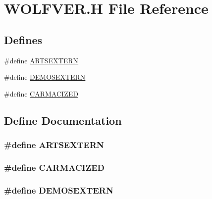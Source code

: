 \hypertarget{WOLFVER_8H}{
\section{WOLFVER.H File Reference}
\label{WOLFVER_8H}
}
\subsection*{Defines}
\begin{DoxyCompactItemize}
\item 
\#define \hyperlink{WOLFVER_8H_a36e8622d432bb1dcfc61ac233148b685}{ARTSEXTERN}
\item 
\#define \hyperlink{WOLFVER_8H_aa38bbec192ab8931f108d382f7833c31}{DEMOSEXTERN}
\item 
\#define \hyperlink{WOLFVER_8H_ab1d0a23b2e2640f4fbf73f30b3586f1b}{CARMACIZED}
\end{DoxyCompactItemize}


\subsection{Define Documentation}
\hypertarget{WOLFVER_8H_a36e8622d432bb1dcfc61ac233148b685}{
\subsubsection[{ARTSEXTERN}]{\setlength{\rightskip}{0pt plus 5cm}\#define ARTSEXTERN}}
\label{WOLFVER_8H_a36e8622d432bb1dcfc61ac233148b685}
\hypertarget{WOLFVER_8H_ab1d0a23b2e2640f4fbf73f30b3586f1b}{
\subsubsection[{CARMACIZED}]{\setlength{\rightskip}{0pt plus 5cm}\#define CARMACIZED}}
\label{WOLFVER_8H_ab1d0a23b2e2640f4fbf73f30b3586f1b}
\hypertarget{WOLFVER_8H_aa38bbec192ab8931f108d382f7833c31}{
\subsubsection[{DEMOSEXTERN}]{\setlength{\rightskip}{0pt plus 5cm}\#define DEMOSEXTERN}}
\label{WOLFVER_8H_aa38bbec192ab8931f108d382f7833c31}
